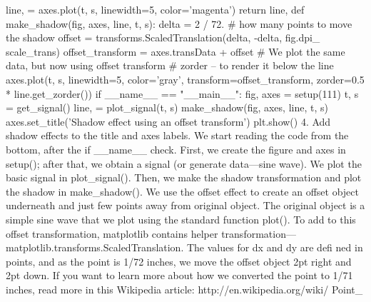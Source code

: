  line, = axes.plot(t, s, linewidth=5, color='magenta')
 return line,
def make_shadow(fig, axes, line, t, s):
 delta = 2 / 72. # how many points to move the shadow
 offset = transforms.ScaledTranslation(delta, -delta, fig.dpi_
scale_trans)
 offset_transform = axes.transData + offset
 # We plot the same data, but now using offset transform
 # zorder -- to render it below the line
 axes.plot(t, s, linewidth=5, color='gray',
 transform=offset_transform,
 zorder=0.5 * line.get_zorder())
if __name__ == "__main__":
 fig, axes = setup(111)
 t, s = get_signal()
 line, = plot_signal(t, s)
 make_shadow(fig, axes, line, t, s)
 axes.set_title('Shadow effect using an offset transform')
 plt.show()
4. Add shadow effects to the title and axes labels.
We start reading the code from the bottom, after the if __name__ check. First, we create
the figure and axes in setup(); after that, we obtain a signal (or generate data—sine wave).
We plot the basic signal in plot_signal(). Then, we make the shadow transformation and
plot the shadow in make_shadow().
We use the offset effect to create an offset object underneath and just few points away from
original object.
The original object is a simple sine wave that we plot using the standard function plot().
To add to this offset transformation, matplotlib contains helper transformation—
matplotlib.transforms.ScaledTranslation.
The values for dx and dy are defi ned in points, and as the point is 1/72 inches, we move the
offset object 2pt right and 2pt down.
If you want to learn more about how we converted the point to 1/71 inches,
read more in this Wikipedia article: http://en.wikipedia.org/wiki/
Point_%

